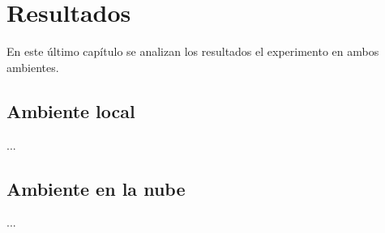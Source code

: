 \chapter{Resultados}

\noindent En este último capítulo se analizan los resultados el experimento en ambos ambientes. 

\newpage

\section{Ambiente local}

\noindent ...

\section{Ambiente en la nube}

\noindent ...

